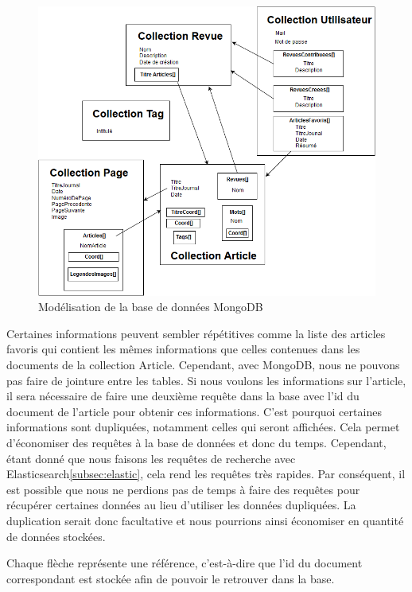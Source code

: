 \begin{figure}[H]
        \centering
        \includegraphics[width=\textwidth]{figure/ModelBDD.png}
            \caption{Modélisation de la base de données MongoDB}
            \label{modelbdd}
\end{figure}

Certaines informations peuvent sembler répétitives comme la liste des articles favoris qui contient les mêmes informations que celles contenues dans les documents de la collection Article. Cependant, avec MongoDB, nous ne pouvons pas faire de jointure entre les tables. Si nous voulons les informations sur l’article, il sera nécessaire de faire une deuxième requête dans la base avec l’id du document de l’article pour obtenir ces informations. C’est pourquoi certaines informations sont dupliquées, notamment celles qui seront affichées. Cela permet d'économiser des requêtes à la base de données et donc du temps. Cependant, étant donné que nous faisons les requêtes de recherche avec Elasticsearch\ref{subsec:elastic}, cela rend les requêtes très rapides. Par conséquent, il est possible que nous ne perdions pas de temps à faire des requêtes pour récupérer certaines données au lieu d'utiliser les données dupliquées. La duplication serait donc facultative et nous pourrions ainsi économiser en quantité de données stockées.


Chaque flèche représente une référence, c’est-à-dire que l’id du document correspondant est stockée afin de pouvoir le retrouver dans la base. 


